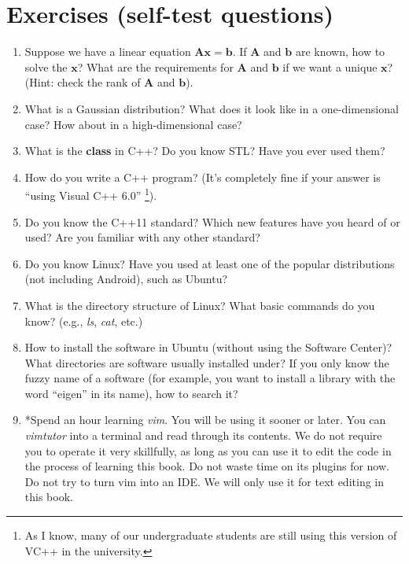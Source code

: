 \section{Exercises (self-test questions)}
\begin{enumerate}
	\item Suppose we have a linear equation $\mathbf{Ax}=\mathbf{b}$. If $\mathbf{A}$ and $\mathbf{b}$ are known, how to solve the $\mathbf{x}$? What are the requirements for $\mathbf{A}$ and $\mathbf{b}$ if we want a unique $\mathbf{x}$? (Hint: check the rank of $\mathbf{A}$ and $\mathbf{b}$).
	
	\item What is a Gaussian distribution? What does it look like in a one-dimensional case? How about in a high-dimensional case?
	
	\item What is the \textbf{class} in C++? Do you know STL? Have you ever used them?
	
	\item How do you write a C++ program? (It's completely fine if your answer is ``using Visual C++ 6.0'' \footnote{As I know, many of our undergraduate students are still using this version of VC++ in the university. }).
	
	\item Do you know the C++11 standard? Which new features have you heard of or used? Are you familiar with any other standard?
	
	\item Do you know Linux? Have you used at least one of the popular distributions (not including Android), such as Ubuntu?
	
	\item What is the directory structure of Linux? What basic commands do you know? (e.g., \textit{ls}, \textit{cat}, etc.)
	
	\item How to install the software in Ubuntu (without using the Software Center)? What directories are software usually installed under? If you only know the fuzzy name of a software (for example, you want to install a library with the word ``eigen'' in its name), how to search it?
	
	\item *Spend an hour learning \textit{vim}. You will be using it sooner or later. You can \textit{vimtutor} into a terminal and read through its contents. We do not require you to operate it very skillfully, as long as you can use it to edit the code in the process of learning this book. Do not waste time on its plugins for now. Do not try to turn vim into an IDE. We will only use it for text editing in this book.
	
\end{enumerate}
